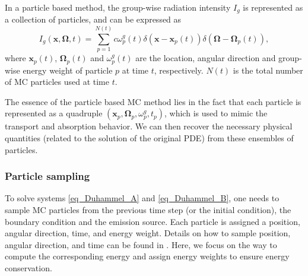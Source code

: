 \documentclass[preprint,12pt]{elsarticle}
\theoremstyle{definition}
\theoremstyle{plain}
\numberwithin{equation}{section}
\numberwithin{algorithm}{section}
\newcounter{eq_count}
\newcommand{\vr}{\mathbf{x}}
\newcommand{\vOmega}{\mathbf{\Omega}}
\newcommand{\vx}{\mathbf{x}}
\begin{document}
    In a particle based method, the group-wise radiation intensity $I_g$ is represented as a collection of particles, and can be expressed as
    \begin{equation*}
I_g(\vx, \vOmega, t)=\sum_{p=1}^{N(t)} c \omega_p^g(t) \delta(\vx-\vx_p(t)) \delta(\vOmega-\vOmega_p(t)),
\end{equation*}
where $\vx_p(t)$, $\vOmega_p(t)$ and $\omega_p^g(t)$ are the location, angular direction and group-wise energy weight of particle $p$ at time $t$, respectively. $N(t)$ is the total number of MC particles used at time $t$. 

The essence of the particle based MC method lies in the fact that each particle is represented as a quadruple $(\vr_p,\vOmega_p,\omega_p^g,t_p)$, which is used to mimic the transport and absorption behavior. We can then recover the necessary physical quantities (related to the solution of the original PDE) from these ensembles of particles.  



 \subsubsection{Particle sampling}
To solve systems \eqref{eq_Duhammel_A} and \eqref{eq_Duhammel_B}, one needs to sample 
MC particles from the previous time step  (or the initial condition), 
the boundary condition and the emission source. 
Each particle is assigned a position, angular direction, time, 
and  energy weight. 
Details on how to sample position, angular direction, and time 
can be found in \cite{fleck1971implicit,wollaber2016four}. 
Here, we focus on the way to compute the corresponding energy 
and assign energy weights to ensure energy conservation.


\end{document}
